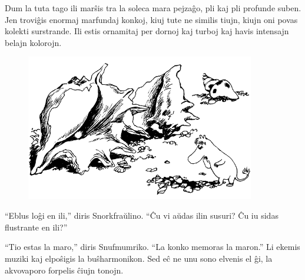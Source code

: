 Dum la tuta tago ili marŝis tra la soleca mara pejzaĝo, pli kaj pli profunde suben. Jen troviĝis enormaj marfundaj konkoj, kiuj tute ne similis tiujn, kiujn oni povas kolekti surstrande. Ili estis ornamitaj per dornoj kaj turboj kaj havis intensajn belajn kolorojn.

\begin{figure}[htbp]
\centering
\includegraphics[width=284pt,height=181pt]{7-7.png}
\caption{}
\label{7-7}
\end{figure}

``Eblus loĝi en ili,'' diris Snorkfraŭlino. ``Ĉu vi aŭdas ilin susuri? Ĉu iu sidas flustrante en ili?''

``Tio estas la maro,'' diris Snufmumriko. ``La konko memoras la maron.'' Li ekemis muziki kaj elpoŝigis la buŝharmonikon. Sed eĉ ne unu sono elvenis el ĝi, la akvovaporo forpelis ĉiujn tonojn.

